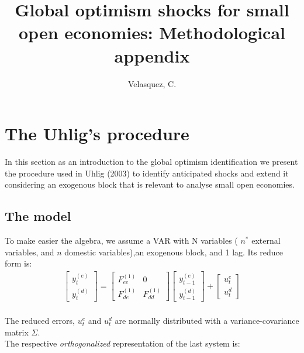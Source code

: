 \documentclass[12pt, a4paper]{article}
\title{\textbf{Global optimism shocks for small open economies: Methodological appendix}}
\author{Velasquez, C.}
\date{}
\begin{document}
\maketitle

\section{The Uhlig's procedure}
In this section as an introduction to the global optimism identification we present the procedure used in Uhlig (2003) to identify anticipated shocks and extend it considering an exogenous block that is relevant to analyse small open economies.
 \subsection{The model}
 To make easier the algebra, we assume a VAR with N variables ( $n^*$ external variables, and $n$ domestic variables),an exogenous block, and 1 lag. Its reduce form is:
	\begin{equation}
	   \begin{aligned}
	     \left[ \begin{array}{c}  y^{(e)}_t  \\ y^{(d)}_t \end{array} \right]
	    =
      	\left[ \begin{array}{cc}  F_{ee}^{(1)} & 0 \\ F_{de}^{(1)} & F_{dd}^{(1)} \end{array} \right]
		\left[ \begin{array}{c}  y^{(e)}_{t-1}  \\ y^{(d)}_{t-1}  \end{array} \right]
	 	+
    	\left[ \begin{array}{c}  u^e_{t}  \\ u^d_{t}  \end{array} \right]
	  \end{aligned}
	\end{equation} \\
	The reduced errors, $u^e_{t}$ and $u^d_{t}$ are normally distributed with a variance-covariance matrix $\Sigma$. \\
	The respective \textit{orthogonalized} representation of the last system is:
\end{document}
